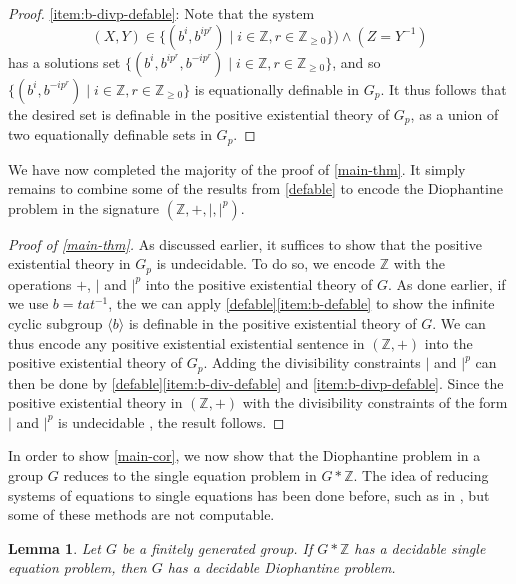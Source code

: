 \documentclass[11pt]{amsart}
\newtheorem{lem}[theorem]{Lemma}
\theoremstyle{definition}
\numberwithin{theorem}{section}
\newcommand{\Z}{\mathbb{Z}}
\begin{document}
\begin{proof}
	\eqref{item:b-divp-defable}: Note that the system
	\[
			(X, Y) \in \{(b^i, b^{i p^r}) \mid i \in \Z, r \in \Z_{\geq 0}\}) \wedge
			(Z = Y^{-1})
	\]
	has a solutions set \(\{(b^i, b^{i p^r}, b^{-ip^r}) \mid i \in \Z, r \in \Z_{\geq 0}\}\),
	and so \(\{(b^i, b^{-ip^r}) \mid i \in \Z, r \in \Z_{\geq 0}\}\) is equationally
	definable in \(G_p\). It thus follows that the desired set is definable in the
	positive existential theory of \(G_p\), as a union of two equationally definable
	sets in \(G_p\).
\end{proof}

We have now completed the majority of the proof of \cref{main-thm}. It simply
remains to combine some of the results from \cref{defable} to encode
the Diophantine problem in the signature \((\Z, +, |, |^p)\).

\begin{proof}[Proof of \cref{main-thm}]
	As discussed earlier, it suffices to show that the positive existential
	theory in \(G_p\) is undecidable. To do so, we encode \(\Z\) with the
	operations \(+\), \(|\) and \(|^p\) into the positive existential theory of
	\(G\). As done earlier, if we use \(b = tat^{-1}\), the we can apply
	\cref{defable}\eqref{item:b-defable} to show the infinite cyclic subgroup
	\(\langle b \rangle\) is definable in the positive existential theory of
	\(G\). We can thus encode any positive existential existential sentence in \((\Z, +)\) into the positive existential theory of \(G_p\).
	Adding the divisibility constraints \(|\) and \(|^p\) can then be done by
	\cref{defable}\eqref{item:b-div-defable} and \eqref{item:b-divp-defable}.
	Since the positive existential theory in \((\Z, +)\) with the divisibility
	constraints of the form \(|\) and \(|^p\) is undecidable
	\cite[Corollary]{Denef}, the result follows.
\end{proof}

In order to show \cref{main-cor}, we now show that the Diophantine problem
in a group \(G\) reduces to the single equation problem in \(G \ast \Z\). The
idea of reducing systems of equations to single equations has been done before,
such as in \cite{Bogopolski22}, but some of these methods are not computable.

\begin{lem}
	\label{SEP-DP}
	Let \(G\) be a finitely generated group. If \(G \ast \Z\) has a decidable
	single equation problem, then \(G\) has a decidable Diophantine problem.
\end{lem}
\end{document}
